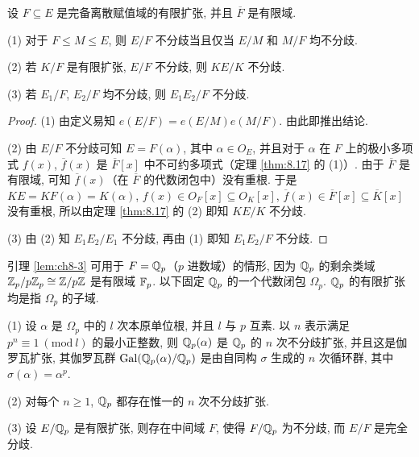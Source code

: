 \begin{lemma}\label{lem:ch8-3}
设 $F\subseteq E$ 是完备离散赋值域的有限扩张, 并且 $\overline{F}$ 是有限域.

(1) 对于 $F\leqslant M\leqslant E$, 则 $E/F$ 不分歧当且仅当 $E/M$ 和 $M/F$ 均不分歧.

(2) 若 $K/F$ 是有限扩张, $E/F$ 不分歧, 则 $KE/K$ 不分歧.

(3) 若 $E_1/F$, $E_2/F$ 均不分歧, 则 $E_1E_2/F$ 不分歧.
\end{lemma}

\begin{proof}
(1) 由定义易知 $e(E/F)=e(E/M)e(M/F)$. 由此即推出结论.

(2) 由 $E/F$ 不分歧可知 $E=F(\alpha)$, 其中 $\alpha\in O_E$, 并且对于 $\alpha$ 在 $F$ 上的极小多项式 $f(x)$, $\overline{f}(x)$ 是 $\overline{F}[x]$ 中不可约多项式（定理 \ref{thm:8.17} 的 (1)）. 由于 $\overline{F}$ 是有限域, 可知 $\overline{f}(x)$（在 $\overline{F}$ 的代数闭包中）没有重根. 于是 $KE=KF(\alpha)=K(\alpha)$, $f(x)\in O_F[x]\subseteq O_K[x]$, $\overline{f}(x)\in\overline{F}[x]\subseteq\overline{K}[x]$ 没有重根, 所以由定理 \ref{thm:8.17} 的 (2) 即知 $KE/K$ 不分歧.

(3) 由 (2) 知 $E_1E_2/E_1$ 不分歧, 再由 (1) 即知 $E_1E_2/F$ 不分歧.
\end{proof}

引理 \ref{lem:ch8-3} 可用于 $F=\mathbb{Q}_p$（$p$ 进数域）的情形, 因为 $\mathbb{Q}_p$ 的剩余类域 $\mathbb{Z}_p/p\mathbb{Z}_p\cong\mathbb{Z}/p\mathbb{Z}$ 是有限域 $\mathbb{F}_p$. 以下固定 $\mathbb{Q}_p$ 的一个代数闭包 $\Omega_p$. $\mathbb{Q}_p$ 的有限扩张均是指 $\Omega_p$ 的子域.

\begin{theorem}\label{thm:8.18}
(1) 设 $\alpha$ 是 $\Omega_p$ 中的 $l$ 次本原单位根, 并且 $l$ 与 $p$ 互素. 以 $n$ 表示满足 $p^n\equiv 1\ (\mathrm{mod}\ l)$ 的最小正整数, 则 $\mathbb{Q}_p(\alpha)$ 是 $\mathbb{Q}_p$ 的 $n$ 次不分歧扩张, 并且这是伽罗瓦扩张, 其伽罗瓦群 $\operatorname{Gal}(\mathbb{Q}_p(\alpha)/\mathbb{Q}_p)$ 是由自同构 $\sigma$ 生成的 $n$ 次循环群, 其中 $\sigma(\alpha)=\alpha^p$.

(2) 对每个 $n\geqslant 1$, $\mathbb{Q}_p$ 都存在惟一的 $n$ 次不分歧扩张.

(3) 设 $E/\mathbb{Q}_p$ 是有限扩张, 则存在中间域 $F$, 使得 $F/\mathbb{Q}_p$ 为不分歧, 而 $E/F$ 是完全分歧.
\end{theorem}

